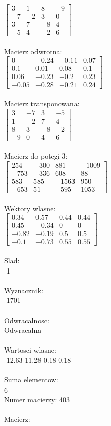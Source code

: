 \documentclass[a4paper,12pt]{article}
\begin{document}
$\begin{bmatrix} 3&1&8&-9\\-7&-2&3&0\\3&7&-8&4\\-5&4&-2&6 \end{bmatrix}$
\\
\\
Macierz odwrotna:\\

$\begin{bmatrix} 0&-0.24&-0.11&0.07\\0.1&0.01&0.08&0.1\\0.06&-0.23&-0.2&0.23\\-0.05&-0.28&-0.21&0.24 \end{bmatrix}$
\\
\\
Macierz transponowana:\\

$\begin{bmatrix} 3&-7&3&-5\\1&-2&7&4\\8&3&-8&-2\\-9&0&4&6 \end{bmatrix}$
\\
\\
Macierz do potegi 3:\\

$\begin{bmatrix} 254&-300&881&-1009\\-753&-336&608&88\\583&585&-1563&950\\-653&51&-595&1053 \end{bmatrix}$
\\
\\
Wektory wlasne:\\

$\begin{bmatrix} 0.34&0.57&0.44&0.44\\0.45&-0.34&0&0\\-0.82&-0.19&0.5&0.5\\-0.1&-0.73&0.55&0.55 \end{bmatrix}$
\\
\\
Slad:\\
-1
\\
\\
Wyznacznik:\\
-1701
\\
\\
Odwracalnosc:\\
Odwracalna
\\
\\
Wartosci wlasne:\\
-12.63 11.28 0.18 0.18
\\
\\
Suma elementow:\\
6
\\
\newpage
Numer macierzy:
403
\\
\\
Macierz:\\
\end{document}
